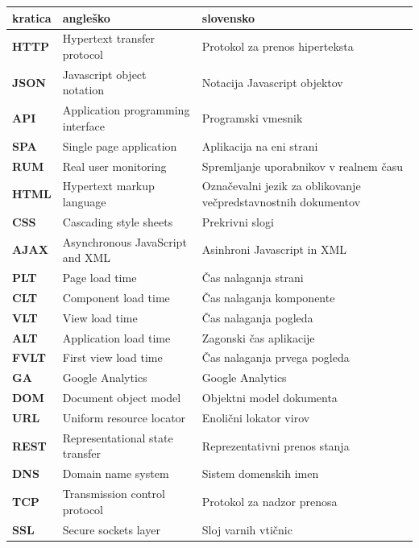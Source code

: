 \documentclass[a4paper, 12pt]{book}
\begin{document}
\noindent\begin{tabular}{p{}|p{}|p{}}    %
  {\bf kratica} & {\bf angleško}  & {\bf slovensko} \\ \hline
  {\bf HTTP}      & Hypertext transfer protocol  & Protokol za prenos hiperteksta \\
  {\bf JSON} & Javascript object notation & Notacija Javascript objektov \\
  {\bf API}   & Application programming interface   & Programski vmesnik \\
  {\bf SPA}   & Single page application   & Aplikacija na eni strani \\
  {\bf RUM}   & Real user monitoring  & Spremljanje uporabnikov v realnem času \\
  {\bf HTML}   & Hypertext markup language  & Označevalni jezik za oblikovanje večpredstavnostnih dokumentov \\
  {\bf CSS}   & Cascading style sheets  & Prekrivni slogi \\
  {\bf AJAX}   & Asynchronous JavaScript and XML  & Asinhroni Javascript in XML \\
  {\bf PLT}   & Page load time  & Čas nalaganja strani \\
  {\bf CLT}   & Component load time  & Čas nalaganja komponente \\
  {\bf VLT}   & View load time  & Čas nalaganja pogleda \\
  {\bf ALT}   & Application load time & Zagonski čas aplikacije \\
  {\bf FVLT}   & First view load time  & Čas nalaganja prvega pogleda \\
  {\bf GA}   & Google Analytics  & Google Analytics \\
  {\bf DOM}   & Document object model  & Objektni model dokumenta \\
  {\bf URL}   & Uniform resource locator  & Enolični lokator virov \\
  {\bf REST}   & Representational state transfer  & Reprezentativni prenos stanja \\
  {\bf DNS}   & Domain name system    & Sistem domenskih imen \\
  {\bf TCP}   & Transmission control protocol  & Protokol za nadzor prenosa \\
  {\bf SSL}   & Secure sockets layer  & Sloj varnih vtičnic \\
                          
\end{tabular}
\end{document}

